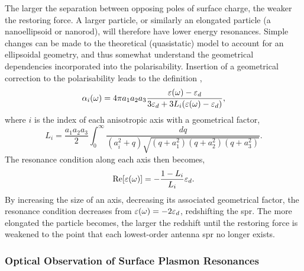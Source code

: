 \documentclass{article}
\begin{document}
The larger the separation between opposing poles of surface charge, the weaker the restoring force. A larger particle, or similarly an elongated particle (a nanoellipsoid or nanorod), will therefore have lower energy resonances. Simple changes can be made to the theoretical (quasistatic) model to account for an ellipsoidal geometry, and thus somewhat understand the geometrical dependencies incorporated into the polarisability. Insertion of a geometrical correction to the polarisability leads to the definition \cite{maier2007plasmonics, noguez2007},
\begin{equation}
	\alpha_i(\omega) = 4\pi a_1a_2a_3\frac{\varepsilon(\omega)-\varepsilon_d}{3\varepsilon_d+3L_i(\varepsilon(\omega)-\varepsilon_d)},
\end{equation}
where $i$ is the index of each anisotropic axis with a geometrical factor,
\begin{equation}
	L_i = \frac{a_1a_2a_3}{2}\int_0^\infty \frac{dq}{(a_i^2+q)\sqrt{(q+a_1^2)(q+a_2^2)(q+a_3^2)}}.
\end{equation}
The resonance condition along each axis then becomes,
\begin{equation}
	\mathrm{Re}\!\left[{\varepsilon(\omega)}\right] = -\frac{1 - L_i}{L_i}\varepsilon_d.
\end{equation}
By increasing the size of an axis, decreasing its associated geometrical factor, the resonance condition decreases from $\varepsilon(\omega)=-2\varepsilon_d$, redshifting the \gls{spr}. The more elongated the particle becomes, the larger the redshift until the restoring force is weakened to the point that each lowest-order antenna \gls{spr} no longer exists.

\subsubsection{Optical Observation of Surface Plasmon Resonances}
\end{document}
